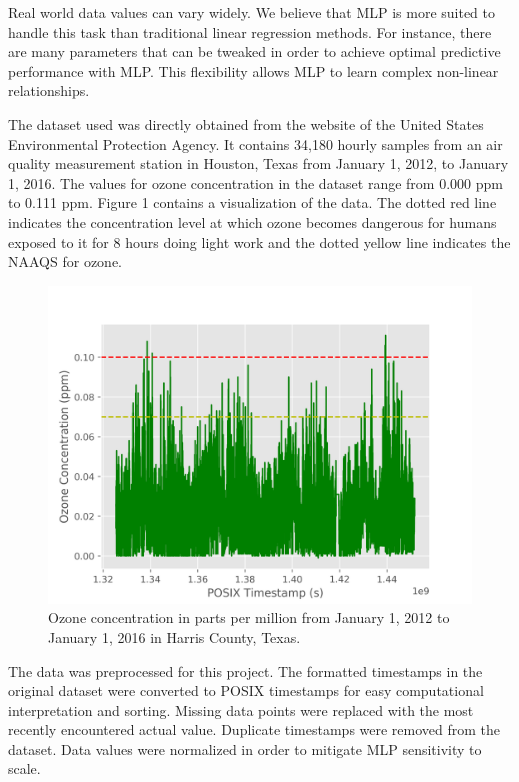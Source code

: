 \documentclass{article}
\begin{document}
Real world data values can vary widely. We believe that MLP is more suited to handle this task than traditional linear regression methods. For instance, there are many parameters that can be tweaked in order to achieve optimal predictive performance with MLP. This flexibility allows MLP to learn complex non-linear relationships. 

The dataset used was directly obtained from the website of the United States Environmental Protection Agency. It contains 34,180 hourly samples from an air quality measurement station in Houston, Texas from January 1, 2012, to January 1, 2016. The values for ozone concentration in the dataset range from 0.000 ppm to 0.111 ppm. Figure 1 contains a visualization of the data. The dotted red line indicates the concentration level at which ozone becomes dangerous for humans exposed to it for 8 hours doing light work \cite{oshalimits} and the dotted yellow line indicates the NAAQS for ozone.

\begin{figure}[H]
    \begin{center}
        \includegraphics[scale=0.75]{ALLDATA.png}
    \end{center}
    \caption{Ozone concentration in parts per million from January 1, 2012 to January 1, 2016 in Harris County, Texas.}
\end{figure}

The data was preprocessed for this project. The formatted timestamps in the original dataset were converted to POSIX timestamps for easy computational interpretation and sorting. Missing data points were replaced with the most recently encountered actual value. Duplicate timestamps were removed from the dataset.  Data values were normalized in order to mitigate MLP sensitivity to scale.
\end{document}
